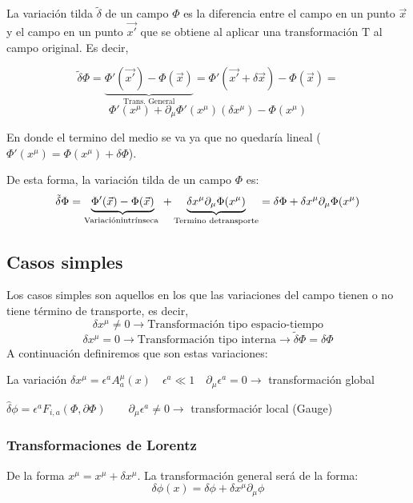 \begin{definition}
  La variación tilda $\tilde{\delta}$ de un campo $\Phi$ es la diferencia entre el campo en un punto $\vec{x}$ y el campo en un punto $\vec{x'}$ que se obtiene al aplicar una transformación $\text{T}$ al campo original. Es decir,
  
  \[\tilde{\delta}\Phi=\underbrace{\Phi'(\vec{x'})-\Phi(\vec{x})}_{\text{Trans. General}}=\Phi'(\vec{x'}+\delta\vec{x})-\Phi(\vec{x})=\]
  \[\Phi'(x^{\mu})+\partial_{\mu}\Phi'(x^{\mu})(\delta x^{\mu})-\Phi(x^{\mu})\]

  En donde el termino del medio se va ya que no quedaría lineal ($\Phi'(x^{\mu})=\Phi(x^{\mu})+\delta \Phi$). 

  De esta forma, la variación tilda de un campo $\Phi$ es:
  \[\tilde{\delta}\Phi=\underbrace{\Phi'(\vec{x})-\Phi(\vec{x})}_{\text{Variación \\ intrínseca }}+\underbrace{\delta x^{\mu}\partial_{\mu}\Phi(x^{\mu})}_{\text{Termino de \\ transporte}}=\delta\Phi+\delta x^{\mu}\partial_{\mu}\Phi(x^{\mu})\]
  
\end{definition}

\subsection{Casos simples}
Los casos simples son aquellos en los que las variaciones del campo tienen o no tiene término de transporte, es decir, 
\[\delta x^{\mu}\neq 0 \longrightarrow\text{Transformación tipo espacio-tiempo}\]
\[\delta x^{\mu}= 0 \longrightarrow\text{Transformación tipo interna} \rightarrow \tilde{\delta}\Phi=\delta\Phi\]
A continuación definiremos que son estas variaciones:
\begin{definition}
  La variación 
  $\delta x^\mu=\epsilon^a A_a^\mu(x) \quad \epsilon^a \ll 1 \quad \partial_\mu \epsilon^a=0 \rightarrow$ transformación global

\end{definition}
\begin{definition}
  $\hat{\delta} \phi=\epsilon^a F_{i, a}(\Phi, \partial \Phi) \quad \quad \partial_\mu \epsilon^a \neq 0 \rightarrow$ transformaciór local (Gauge)
\end{definition}
\subsubsection{Transformaciones de Lorentz}
De la forma $x^\mu = x^\mu + \delta x^\mu$. La transformación general será de la forma:
$$
\delta \phi(x) = \delta \phi + \delta x^\mu \partial_\mu \phi
$$

